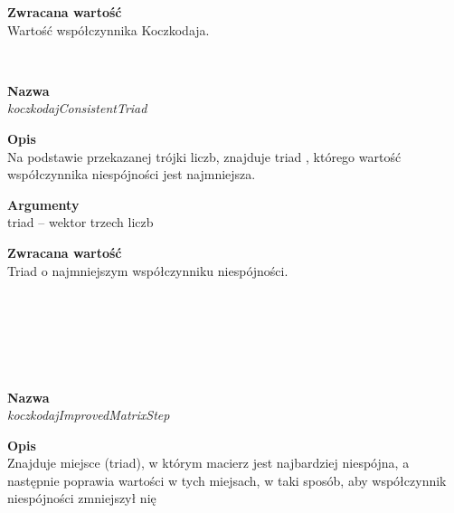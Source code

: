 \begin{spacing}{1.1}
\begin{spacing}{1.2}
\begin{spacing}{1.2}
\begin{spacing}{1.2}
\begin{spacing}{1.2}
\textbf{Zwracana wartość}\\ Wartość współczynnika Koczkodaja. \\ \begin{spacing}{0.3}  \end{spacing}


\newpage
\begin{spacing}{1.2}
 \\ \begin{spacing}{0.5}  \end{spacing}

\textbf{Nazwa}\\  \emph{koczkodajConsistentTriad} \\ \begin{spacing}{0.3}  \end{spacing}
 
\textbf{Opis}\\ Na podstawie przekazanej trójki liczb, znajduje triad , którego wartość współczynnika niespójności jest najmniejsza.\\  \begin{spacing}{0.3}  \end{spacing}
 
\textbf{Argumenty} \\
triad -- wektor trzech liczb \\ \begin{spacing}{0.3}  \end{spacing}

\textbf{Zwracana wartość}\\ Triad o najmniejszym współczynniku niespójności. \\ \begin{spacing}{0.3}  \end{spacing}\\


\\~\\
\begin{spacing}{1.2}
 \\ \begin{spacing}{0.5}  \end{spacing}

\textbf{Nazwa}\\  \emph{koczkodajImprovedMatrixStep} \\ \begin{spacing}{0.3}  \end{spacing}
 
\textbf{Opis}\\ Znajduje miejsce (triad), w którym macierz jest najbardziej niespójna, a następnie poprawia wartości w tych miejsach, w taki sposób, aby współczynnik niespójności zmniejszył nię \\  \begin{spacing}{0.3}  \end{spacing}
 

\end{spacing}
\end{spacing}
\end{spacing}
\end{spacing}
\end{spacing}
\end{spacing}
\end{spacing}
